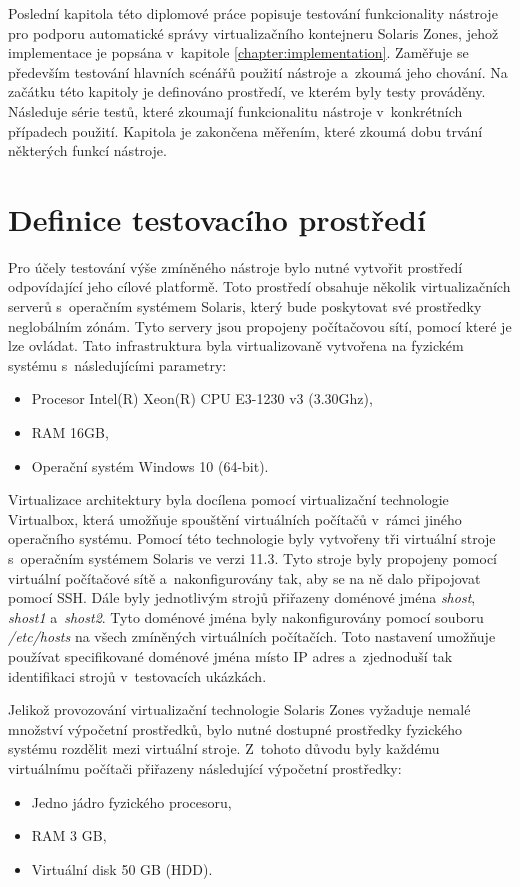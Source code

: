 \label{chapter:testing}
Poslední kapitola této diplomové práce popisuje testování funkcionality nástroje pro podporu automatické správy virtualizačního
kontejneru Solaris Zones, jehož implementace je popsána v~kapitole \ref{chapter:implementation}. Zaměřuje se především testování
hlavních scénářů použití nástroje a~zkoumá jeho chování. Na začátku této kapitoly je definováno prostředí, ve kterém byly
testy prováděny. Následuje série testů, které zkoumají funkcionalitu nástroje v~konkrétních případech použití. Kapitola je zakončena
měřením, které zkoumá dobu trvání některých funkcí nástroje.
\section{Definice testovacího prostředí}
\label{chapter:testing:environment}
Pro účely testování výše zmíněného nástroje bylo nutné vytvořit prostředí odpovídající jeho cílové platformě. Toto prostředí
obsahuje několik virtualizačních serverů s~operačním systémem Solaris, který bude poskytovat své prostředky neglobálním zónám.
Tyto servery jsou propojeny počítačovou sítí, pomocí které je lze ovládat. Tato infrastruktura byla virtualizovaně vytvořena na 
fyzickém systému s~následujícími parametry:
\begin{itemize}
 \item Procesor Intel(R) Xeon(R) CPU E3-1230 v3 (3.30Ghz),
 \item RAM 16GB,
 \item Operační systém Windows 10 (64-bit).
\end{itemize}
Virtualizace architektury byla docílena pomocí virtualizační technologie Virtualbox, která umožňuje spouštění virtuálních 
počítačů v~rámci jiného operačního systému. Pomocí této technologie byly vytvořeny tři virtuální stroje s~operačním systémem
Solaris ve verzi 11.3. Tyto stroje byly propojeny pomocí virtuální počítačové sítě a~nakonfigurovány tak, aby se na ně dalo 
připojovat pomocí SSH. Dále byly jednotlivým strojů přiřazeny doménové jména \textit{shost}, \textit{shost1} a~\textit{shost2}.
Tyto doménové jména byly nakonfigurovány pomocí souboru \textit{/etc/hosts} na všech zmíněných virtuálních počítačích. Toto
nastavení umožňuje používat specifikované doménové jména místo IP adres a~zjednoduší tak identifikaci strojů v~testovacích
ukázkách. 

Jelikož provozování virtualizační technologie Solaris Zones vyžaduje nemalé množství výpočetní prostředků, bylo nutné
dostupné prostředky fyzického systému rozdělit mezi virtuální stroje. Z~tohoto důvodu byly každému virtuálnímu počítači
přiřazeny následující výpočetní prostředky:
\begin{itemize}
 \item Jedno jádro fyzického procesoru,
 \item RAM 3 GB,
 \item Virtuální disk 50 GB (HDD).
\end{itemize}

